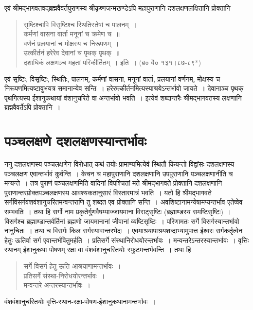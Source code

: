 एवं श्रीमद्भागवतवद्ब्रह्मवैवर्तपुराणस्य श्रीकृष्णजन्मखण्डेऽपि महापुराणानि दशलक्षणलक्षितानि प्रोक्तानि -
\begin{verse}
सृष्टिश्चापि विसृष्टिश्च स्थितिस्तेषां च पालनम्~।\\
कर्मणां वासना वार्ता मनूनां च क्रमेण च~॥\\
वर्णनं प्रलयानां च मोक्षस्य च निरूपणम्~।\\
उत्कीर्तनं हरेरेव देवानां च पृथक् पृथक्~॥\\
दशाधिकं लक्षणञ्च महतां परिकीर्तितम्~। इति~। (ब्र० वै० १३१।८७-८९*)
\end{verse}
एवं सृष्टिः, विसृष्टिः, स्थितिः, पालनम्, कर्मणां वासना, मनूनां वार्ता, प्रलयानां वर्णनम्, मोक्षस्य च निरूपणमित्यष्टावुभयत्र समानान्येव सन्ति~। हरेरुत्कीर्तनमित्यस्याश्रयेऽन्तर्भावो जायते~। देवानाञ्च पृथक् पृथगित्यस्य ईशानुकथायां वंशानुचरिते वा अन्तर्भावो भवति~। इत्येवं शब्दान्तरैः श्रीमद्भागवतस्य लक्षणानि ब्रह्मवैवर्तेऽपि प्रोक्तानि~।

\section*{पञ्चलक्षणे दशलक्षणस्यान्तर्भावः}

ननु दशलक्षणस्य पञ्चलक्षणेन विरोधात् कथं तयोः प्रामाण्यमित्येवं स्थितौ कियन्तो विद्वांसः दशलक्षणस्य पञ्चलक्षण एवान्तर्भावं कुर्वन्ति~। केचन च महापुराणानि दशलक्षणानि उपपुराणानि पञ्चलक्षणानीति च मन्यन्ते~। तत्र पुराणं पञ्चलक्षणमिति वादिनां विपश्चितां मते श्रीमद्भागवते प्रोक्तानि दशलक्षणानि पुराणान्तरप्रोक्तपञ्चलक्षणस्य आवश्यकतानुसारं विस्तारमात्रं भवति~। यतो हि श्रीमद्भागवते सर्गविसर्गवंशवंशानुचरितमन्वन्तराणि तु शब्दत एव प्रोक्तानि सन्ति~। अवशिष्टानामन्येषामप्यन्तर्भाव एतेष्वेव सम्भवति~। तथा हि सर्गो नाम प्रकृतेर्गुणवैषम्याज्जायमाना विराट्सृष्टिः (ब्रह्माण्डस्य समष्टिसृष्टिः)~। विसर्गश्च ब्रह्माण्डान्तर्वर्तिनां ब्रह्मणो जायमानानां जीवानां व्यष्टिसृष्टिः~। परिणामतः सर्गे विसर्गस्यान्तर्भावो नानुचितः~। तथा च विसर्गः किल सर्गस्यावान्तरभेदः~। एवमाश्रयापाश्रयशब्दाभ्यामुपात्त ईश्वरः सर्गकर्तृत्वेन हेतुः ऊतिर्वा सर्ग एवान्तर्भवितुमर्हति~। प्रतिसर्गे संस्थानिरोधयोरन्तर्भावः~। मन्वन्तरेऽन्तरस्यान्तर्भावः~। वृत्तिः स्थानम् ईशानुकथा पोषणम् रक्षा वा वंशवंशानुचरितयोः स्फुटमन्तर्भवन्ति~।
तथा हि
\begin{verse}
सर्गे विसर्ग-हेतु-ऊति-आश्रयाणामन्तर्भावः~।\\
प्रतिसर्गे संस्था-निरोधयोरन्तर्भावः~।\\
मन्वन्तरे अन्तरस्यान्तर्भावः~।
\end{verse}
वंशवंशानुचरितयोः वृत्ति-स्थान-रक्षा-पोषण-ईशानुकथानामन्तर्भावः~।

